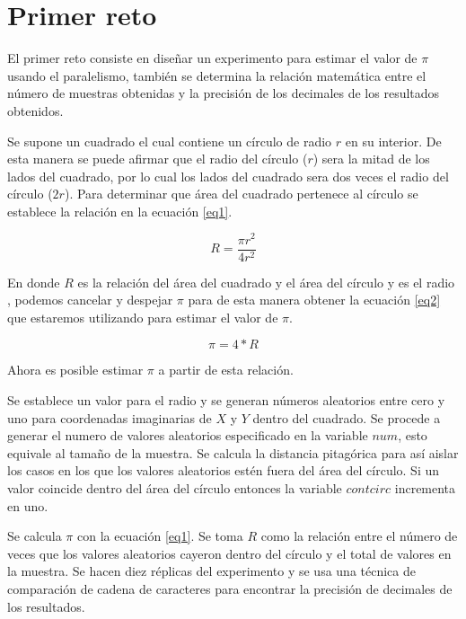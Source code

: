 \documentclass{article}
\begin{document}
\section{Primer reto}
El primer reto consiste en diseñar un experimento para estimar el valor de $\pi$ usando el paralelismo, también se determina la relación matemática entre el número de muestras obtenidas y la precisión de los decimales de los resultados obtenidos.

Se supone un cuadrado el cual contiene un círculo de radio $r$ en su interior.
De esta manera se puede afirmar que el radio del círculo ($r$) sera la mitad de los lados del cuadrado, por lo cual los lados del cuadrado sera dos veces el radio del círculo ($2r$).
Para determinar que área del cuadrado pertenece al círculo se establece la relación en la ecuación \ref{eq1}.

\begin{equation}
\label{eq1}
R = \frac {\pi r^2 } {4 r^2}
\end{equation}

En donde $R$ es la relación del área del cuadrado y el área del círculo y  es el radio , podemos cancelar y despejar $\pi$ para de esta manera obtener la ecuación \ref{eq2} que estaremos utilizando para estimar el valor de $\pi$.

\begin{equation}
\label{eq2}
\pi = {4} * { R}
\end{equation}

Ahora es posible estimar $\pi$ a partir de esta relación.



Se establece un valor para el radio y se generan números aleatorios entre cero y uno para coordenadas imaginarias de $X$ y $Y$ dentro del cuadrado. Se procede a generar el numero de valores aleatorios especificado en la variable $num$, esto equivale al tamaño de la muestra. Se calcula la distancia pitagórica para así aislar los casos en los que los valores aleatorios estén fuera del área del círculo.
Si un valor coincide dentro del área del círculo entonces la variable $contcirc$ incrementa en uno.

Se calcula $\pi$ con la ecuación \ref{eq1}.
Se toma $R$ como la relación entre el número de veces que los valores aleatorios cayeron dentro del círculo y el total de valores en la muestra.
Se hacen diez réplicas del experimento y se usa una técnica de comparación de cadena de caracteres para encontrar la precisión de decimales de los resultados.
\end{document}
